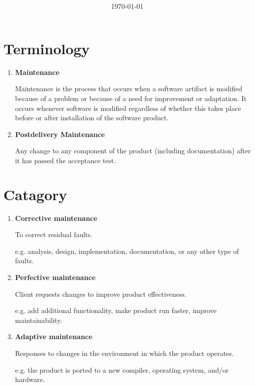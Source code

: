 \documentclass[11pt]{article}
\title{\textbf{\Topic}}
\author{\Name}
\date{\today}
\begin{document}
\maketitle
\noindent\makebox[\linewidth]{\rule[8pt]{5in}{0.5pt}}

\section*{Terminology}

\begin{enumerate}

	\item \textbf{Maintenance}
	
	Maintenance is the process that occurs when a software artifact is modified because of a problem or because of a need for improvement or adaptation.
	It occurs whenever software is modified regardless of whether this takes place before or after installation of the software product.
	
	\item \textbf{Postdelivery Maintenance}
	
	Any change to any component of the product (including documentation) after it has passed the acceptance test.

\end{enumerate}

 
\section*{Catagory}
 
\begin{enumerate}

	\item \textbf{Corrective maintenance}
	
	To correct residual faults. 
	
	e.g. analysis, design, implementation, documentation, or any other type of faults.
	
	\item \textbf{Perfective maintenance}
	
	Client requests changes to improve product effectiveness.

	e.g. add additional functionality, make product run faster, improve maintainability.
	
	\item \textbf{Adaptive maintenance}
	
	Responses to changes in the environment in which the product operates.
	
	e.g. the product is ported to a new compiler, operating system, and/or hardware.

\end{enumerate}
\end{document}
